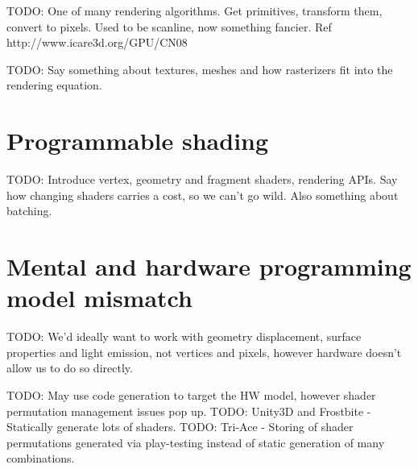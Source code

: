 TODO: One of many rendering algorithms. Get primitives, transform them, convert to pixels. Used to be scanline, now something fancier. Ref http://www.icare3d.org/GPU/CN08

TODO: Say something about textures, meshes and how rasterizers fit into the rendering equation.

\section{Programmable shading}

TODO: Introduce vertex, geometry and fragment shaders, rendering APIs. Say how changing shaders carries a cost, so we can't go wild. Also something about batching.

\section{Mental and hardware programming model mismatch}

TODO: We'd ideally want to work with geometry displacement, surface properties and light emission, not vertices and pixels, however hardware doesn't allow us to do so directly.

TODO: May use code generation to target the HW model, however shader permutation management issues pop up.
	TODO: Unity3D and Frostbite - Statically generate lots of shaders.
	TODO: Tri-Ace - Storing of shader permutations generated via play-testing instead of static generation of many combinations.

